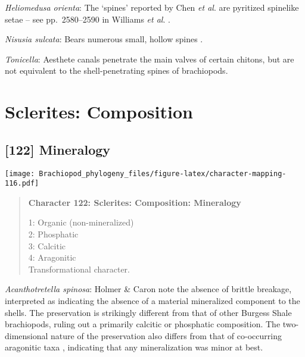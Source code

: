 \documentclass[openany]{book}
\theoremstyle{definition}
\theoremstyle{definition}
\theoremstyle{definition}
\theoremstyle{remark}
\begin{document}
\hypertarget{Heliomedusa_orienta-coding-121}{}
\emph{Heliomedusa orienta}: The `spines' reported by Chen \emph{et al}.
\citeyearpar{Chen2007Reinterpretationof} are pyritized spinelike\\
setae -- see pp.~2580--2590 in Williams \emph{et al}.
\citeyearpar{Williams2007Supplement}.

\hypertarget{Nisusia_sulcata-coding-121}{}
\emph{Nisusia sulcata}: Bears numerous small, hollow spines
\citep{Williams2000LinguliformeaCraniiformea}.

\hypertarget{Tonicella-coding-121}{}
\emph{Tonicella}: Aesthete canals penetrate the main valves of certain
chitons, but are not equivalent to the shell-penetrating spines of
brachiopods.

\section{Sclerites: Composition}\label{sclerites-composition}

\subsection*{{[}122{]} Mineralogy}\label{mineralogy}

\texttt{[image: Brachiopod\_phylogeny\_files/figure-latex/character-mapping-116.pdf]}

\begin{quote}
\textbf{Character 122: Sclerites: Composition: Mineralogy}

1: Organic (non-mineralized)\\
2: Phosphatic\\
3: Calcitic\\
4: Aragonitic\\
Transformational character.
\end{quote}

\hypertarget{Acanthotretella_spinosa-coding-122}{}
\emph{Acanthotretella spinosa}: Holmer \& Caron
\citeyearpar{Holmer2006Aspinose} note the absence of brittle breakage,
interpreted as indicating the absence of a material mineralized
component to the shells. The preservation is strikingly different from
that of other Burgess Shale brachiopods, ruling out a primarily calcitic
or phosphatic composition. The two-dimensional nature of the
preservation also differs from that of co-occurring aragonitic taxa
\citep[hyoliths;][ p.~273]{Holmer2006Aspinose}, indicating that any
mineralization was minor at best.
\end{document}
